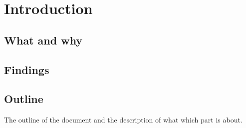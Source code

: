 \section{Introduction}

\subsection{What and why}

\subsection{Findings}

\subsection{Outline}
The outline of the document and the description of what which part is about. 



